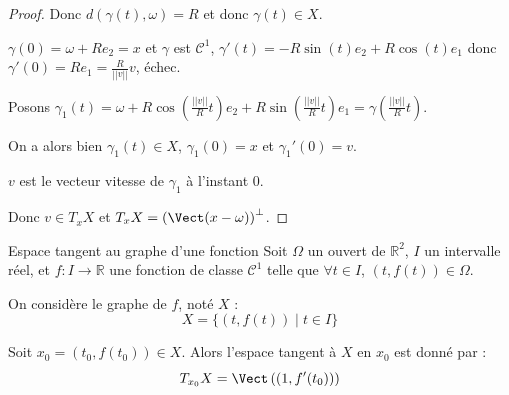 \begin{proof}
    Donc $d(\gamma(t), \omega) = R$ et donc $\gamma(t) \in X$.

    $\gamma(0) = \omega + R e_2 = x$ et $\gamma$ est $\mathscr C^1$, $\gamma'(t) = -R \sin(t) e_2 + R \cos(t) e_1$ donc
    $\gamma'(0) = R e_1 = \frac{R}{||v||} v$, échec. 

    Posons $\gamma_1(t) = \omega + R \cos\left( \frac{||v||}{R} t \right) e_2 + R \sin\left( \frac{||v||}{R} t \right) e_1 = \gamma\left( \frac{||v||}{R} t \right)$.

    On a alors bien $\gamma_1(t) \in X$, $\gamma_1(0) = x$ et 
    $\gamma_1'(0) = v$.

    $v$ est le vecteur vitesse de $\gamma_1$ à l'instant $0$. 

    Donc $v \in T_xX$ et $T_xX = \left( \Vect(x - \omega) \right)^\perp$.
\end{proof}


\begin{proposition}{Espace tangent au graphe d'une fonction}{}
    Soit $\Omega$ un ouvert de $\mathbb{R}^2$, $I$ un intervalle réel, et $f : I \to \mathbb{R}$ une fonction de classe $\mathscr{C}^1$ telle que $\forall t \in I$, $(t, f(t)) \in \Omega$.
    
    On considère le graphe de $f$, noté $X$ :
    \[
        X = \{(t, f(t)) \mid t \in I\}
    \]
    
    Soit $x_0 = (t_0, f(t_0)) \in X$. Alors l'espace tangent à $X$ en $x_0$ est donné par :
    \[
        T_{x_0}X = \Vect\left( (1, f'(t_0)) \right)
    \]
\end{proposition}

